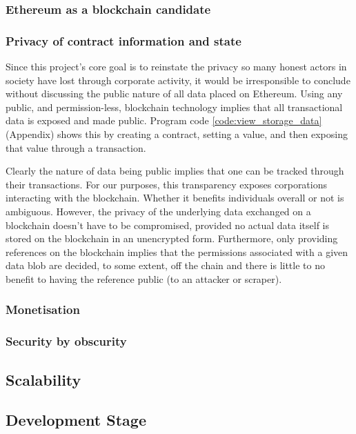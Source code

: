 \subsubsection{Ethereum as a blockchain candidate}

\subsubsection{Privacy of contract information and state}

Since this project's core goal is to reinstate the privacy so many honest actors in society have lost through corporate activity, it would be irresponsible to conclude without discussing the public nature of all data placed on Ethereum. Using any public, and permission-less, blockchain technology implies that all transactional data is exposed and made public. Program code \ref{code:view_storage_data} (Appendix) shows this by creating a contract, setting a value, and then exposing that value through a transaction.

Clearly the nature of data being public implies that one can be tracked through their transactions. For our purposes, this transparency exposes corporations interacting with the blockchain. Whether it benefits individuals overall or not is ambiguous. However, the privacy of the underlying data exchanged on a blockchain doesn't have to be compromised, provided no actual data itself is stored on the blockchain in an unencrypted form. Furthermore, only providing references on the blockchain implies that the permissions associated with a given data blob are decided, to some extent, off the chain and there is little to no benefit to having the reference public (to an attacker or scraper).

\subsubsection{Monetisation}

\subsubsection{Security by obscurity}

\subsection{Scalability}

\subsection{Development Stage}
